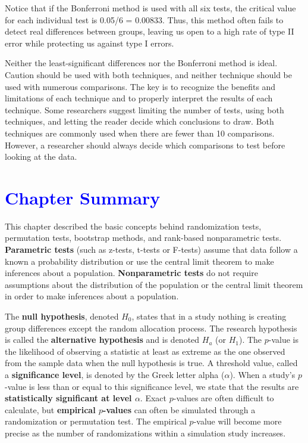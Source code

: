 \documentclass[
]{report}
\begin{document}
Notice that if the Bonferroni method is used with all six tests, the critical value for each individual test is 0.05/6 = 0.00833. Thus, this method often fails to detect real differences between groups, leaving us open to a high rate of type II error while protecting us against type I errors.

Neither the least-significant differences nor the Bonferroni method is ideal. Caution should be used with both techniques, and neither technique should be used with numerous comparisons. The key is to recognize the benefits and limitations of each technique and to properly interpret the results of each technique. Some researchers suggest limiting the number of tests, using both techniques, and letting the reader decide which conclusions to draw. Both techniques are commonly used when there are fewer than 10 comparisons. However, a researcher should always decide which comparisons to test before looking at the data.

\hypertarget{section-13}{%
\section{\texorpdfstring{\textcolor{blue}{Chapter Summary}}{}}\label{section-13}}

This chapter described the basic concepts behind randomization tests, permutation tests, bootstrap methods, and rank-based nonparametric tests. \textbf{Parametric tests} (such as z-tests, t-tests or F-tests) assume that data follow a known a probability distribution or use the central limit theorem to make inferences about a population. \textbf{Nonparametric tests} do not require assumptions about the distribution of the population or the central limit theorem in order to make inferences about a population.

The \textbf{null hypothesis}, denoted \(\scriptstyle H_0\), states that in a study nothing is creating group differences except the random allocation process. The research hypothesis is called the \textbf{alternative hypothesis} and is denoted \(\scriptstyle H_a\) (or \(\scriptstyle H_1\)). The \(\scriptstyle p\)-value is the likelihood of observing a statistic at least as extreme as the one observed from the sample data when the null hypothesis is true. A threshold value, called a \textbf{significance level}, is denoted by the Greek letter alpha (\(\scriptstyle \alpha\)). When a study's \(\scriptstyle p\)-value is less than or equal to this significance level, we state that the results are \textbf{statistically significant at level \(\scriptstyle \alpha\)}. Exact \(\scriptstyle p\)-values are often difficult to calculate, but \textbf{empirical \(\scriptstyle p\)-values} can often be simulated through a randomization or permutation test. The empirical \(\scriptstyle p\)-value will become more precise as the number of randomizations within a simulation study
increases.
\end{document}
